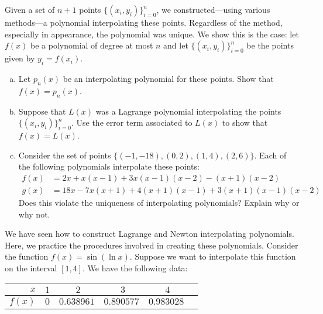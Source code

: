 \documentclass[11pt,letterpaper]{article}
\begin{document}


 Given a set of $n + 1$ points $\{(x_i, y_i)\}_{i=0}^n$, we constructed---using various methods---a polynomial interpolating these points. Regardless of the method, especially in appearance, the polynomial was unique. We show this is the case: let $f(x)$ be a polynomial of degree at most $n$ and let $\{(x_i, y_i)\}_{i=0}^n$ be the points given by $y_i= f(x_i)$. 
	\begin{enumerate}[(a)]
	\item Let $p_n(x)$ be an interpolating polynomial for these points. Show that $f(x)= p_n(x)$. 
	\item Suppose that $L(x)$ was a Lagrange polynomial interpolating the points $\{(x_i, y_i)\}_{i=0}^n$. Use the error term associated to $L(x)$ to show that $f(x)= L(x)$. 
	\item Consider the set of points $\{ (-1, -18), (0, 2), (1, 4), (2, 6) \}$. Each of the following polynomials interpolate these points:
		\[
		\begin{aligned}
		f(x)&= 2x + x(x - 1) + 3x(x - 1)(x - 2) - (x + 1)(x - 2) \\
		g(x)&= 18x - 7x(x + 1) + 4(x + 1)(x - 1) + 3(x + 1)(x - 1)(x - 2)
		\end{aligned}
		\]
	Does this violate the uniqueness of interpolating polynomials? Explain why or why not.
	\end{enumerate}



\newpage



 We have seen how to construct Lagrange and Newton interpolating polynomials. Here, we practice the procedures involved in creating these polynomials. Consider the function $f(x)= \sin(\ln x)$. Suppose we want to interpolate this function on the interval $[1, 4]$. We have the following data:
	\begin{table}[!ht]
	\centering
	\begin{tabular}{r|rrrrr}
	$x$ & $1$ & $2\phantom{000}$ & $3\phantom{000}$ & $4\phantom{000}$ \\ \hline
	$f(x)$ & $0$ & $0.638961$ & $0.890577$ & $0.983028$  
	\end{tabular}
	\end{table}
\end{document}
